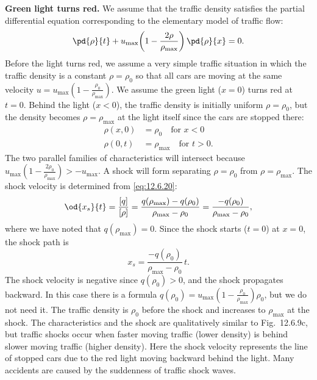\textbf{Green light turns red.}  We assume that the traffic density satisfies the partial differential equation corresponding to the elementary model of traffic flow:
\[
\pd{\rho}{t} + u_{\max}\!\left(1 - \frac{2\rho}{\rho_{\max}}\right)\pd{\rho}{x} = 0.
\]
Before the light turns red, we assume a very simple traffic situation in which the traffic density is a constant $\rho = \rho_0$ so that all cars are moving at the same velocity $u = u_{\max}(1 - \frac{\rho_0}{\rho_{\max}})$.  We assume the green light ($x = 0$) turns red at $t = 0$.  Behind the light ($x < 0$), the traffic density is initially uniform $\rho = \rho_0$, but the density becomes $\rho = \rho_{\max}$ at the light itself since the cars are stopped there:
\begin{align*}
\rho(x,0) &= \rho_0 \quad \text{for } x < 0 \\
\rho(0,t) &= \rho_{\max} \quad \text{for } t > 0.
\end{align*}
The two parallel families of characteristics will intersect because $u_{\max}(1 - \frac{2\rho_0}{\rho_{\max}}) > -u_{\max}$.  A shock will form separating $\rho = \rho_0$ from $\rho = \rho_{\max}$.  The shock velocity is determined from \eqref{eq:12.6.20}:
\[
\od{x_s}{t} = \frac{[q]}{[\rho]} = \frac{q(\rho_{\max}) - q(\rho_0)}{\rho_{\max} - \rho_0} = \frac{-q(\rho_0)}{\rho_{\max} - \rho_0},
\]
where we have noted that $q(\rho_{\max}) = 0$.  Since the shock starts ($t = 0$) at $x = 0$, the shock path is
\[
x_s = \frac{-q(\rho_0)}{\rho_{\max} - \rho_0}\,t.
\]
The shock velocity is negative since $q(\rho_0) > 0$, and the shock propagates backward.  In this case there is a formula $q(\rho_0) = u_{\max}(1 - \frac{\rho_0}{\rho_{\max}})\rho_0$, but we do not need it.  The traffic density is $\rho_0$ before the shock and increases to $\rho_{\max}$ at the shock.  The characteristics and the shock are qualitatively similar to Fig.~12.6.9c, but traffic shocks occur when faster moving traffic (lower density) is behind slower moving traffic (higher density).  Here the shock velocity represents the line of stopped cars due to the red light moving backward behind the light.  Many accidents are caused by the suddenness of traffic shock waves.

